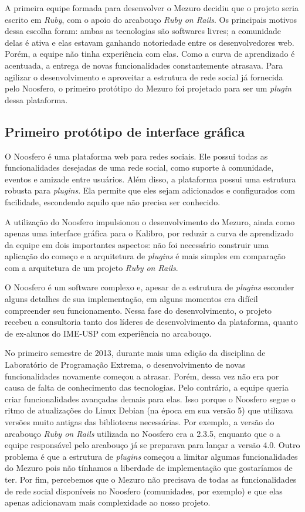 \documentclass{llncs}
\begin{document}
  A primeira equipe formada para desenvolver o Mezuro decidiu que o projeto seria escrito em \textit{Ruby}, com o apoio do arcabouço \textit{Ruby on Rails}. Os principais motivos dessa escolha foram: ambas as tecnologias são softwares livres; a comunidade delas é ativa e elas estavam ganhando notoriedade entre os desenvolvedores web. Porém, a equipe não tinha experiência com elas. Como a curva de aprendizado é acentuada, a entrega de novas funcionalidades constantemente atrasava. Para agilizar o desenvolvimento e aproveitar a estrutura de rede social já fornecida pelo Noosfero, o primeiro protótipo do Mezuro foi projetado para ser um \textit{plugin} dessa plataforma.

  \subsection{Primeiro protótipo de interface gráfica}\label{sec:primeiro-prototipo}

  O Noosfero é uma plataforma web para redes sociais. Ele possui todas as funcionalidades desejadas de uma rede social, como suporte à comunidade, eventos e amizade entre usuários. Além disso, a plataforma possui uma estrutura robusta para \textit{plugins}. Ela permite que eles sejam adicionados e configurados com facilidade, escondendo aquilo que não precisa ser conhecido.

  A utilização do Noosfero impulsionou o desenvolvimento do Mezuro, ainda como apenas uma interface gráfica para o Kalibro, por reduzir a curva de aprendizado da equipe em dois importantes aspectos: não foi necessário construir uma aplicação do começo e a arquitetura de \textit{plugins} é mais simples em comparação com a arquitetura de um projeto \textit{Ruby on Rails}.

  O Noosfero é um software complexo e, apesar de a estrutura de \textit{plugins} esconder alguns detalhes de sua implementação, em alguns momentos era difícil compreender seu funcionamento. Nessa fase do desenvolvimento, o projeto recebeu a consultoria tanto dos líderes de desenvolvimento da plataforma, quanto de ex-alunos do IME-USP com experiência no arcabouço.

  No primeiro semestre de 2013, durante mais uma edição da disciplina de Laboratório de Programação Extrema, o desenvolvimento de novas funcionalidades novamente começou a atrasar. Porém, dessa vez não era por causa de falta de conhecimento das tecnologias. Pelo contrário, a equipe queria criar funcionalidades avançadas demais para elas. Isso porque o Noosfero segue o ritmo de atualizações do Linux Debian (na época em sua versão 5) que utilizava versões muito antigas das bibliotecas necessárias. Por exemplo, a versão do arcabouço \textit{Ruby on Rails} utilizada no Noosfero era a 2.3.5, enquanto que o a equipe responsável pelo arcabouço já se preparava para lançar a versão 4.0. Outro problema é que a estrutura de \textit{plugins} começou a limitar algumas funcionalidades do Mezuro pois não tínhamos a liberdade de implementação que gostaríamos de ter. Por fim, percebemos que o Mezuro não precisava de todas as funcionalidades de rede social disponíveis no Noosfero (comunidades, por exemplo) e que elas apenas adicionavam mais complexidade ao nosso projeto.
\end{document}
